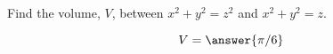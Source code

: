 \documentclass{ximera}
\author{David Guichard \and Neal Koblitz \and H. Jerome Keisler \and Albert Scheller \and Barry Balof \and Mike Wills \and Matthew Carr}
\begin{document}
\begin{exercise}





Find the volume, $V$, between $x^2+y^2=z^2$ and $x^2+y^2=z$.
\begin{prompt}
\[
V=\answer{\pi/6}
\]
\end{prompt}



\end{exercise}
\end{document}
